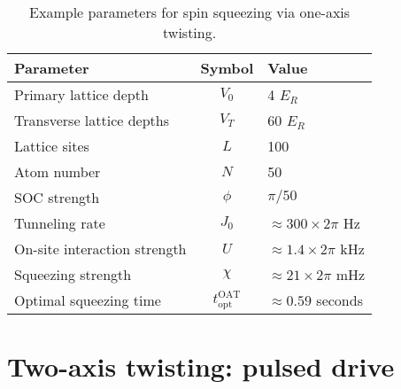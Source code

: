 \documentclass[aps,notitlepage,nofootinbib,11pt]{revtex4-1}
\renewcommand{\t}{\text} %
\newcommand{\1}{\mathds{1}}
\begin{document}
\begin{table}[h]
  \centering
  \caption{Example parameters for spin squeezing via one-axis
    twisting.}
  \label{tab:parameters}
  \begin{tabular}{|l|c|l|}
    \hline
    Parameter & Symbol & Value \\ \hline\hline
    Primary lattice depth & $V_0$ & 4 $E_R$ \\
    Transverse lattice depths & $V_T$ & 60 $E_R$ \\
    Lattice sites & $L$ & 100 \\
    Atom number & $N$ & 50 \\
    SOC strength & $\phi$ & $\pi/50$ \\ \hline\hline
    Tunneling rate & $J_0$ & $\approx300\times2\pi$ Hz \\
    On-site interaction strength & $U$ & $\approx1.4\times2\pi$ kHz \\
    Squeezing strength & $\chi$ & $\approx21\times2\pi$ mHz \\
    Optimal squeezing time & $t_{\t{opt}}^{\t{OAT}}$
    & $\approx0.59$ seconds \\ \hline
  \end{tabular}
\end{table}


\section{Two-axis twisting: pulsed drive}
\end{document}

